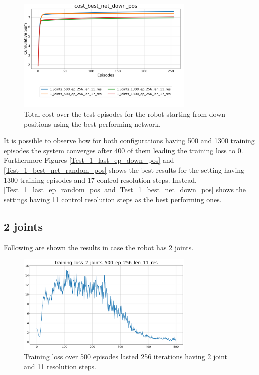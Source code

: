\documentclass[twocolumn, a4paper]{article}
\begin{document}
\begin{figure}[H]
	\centering
	\includegraphics[width=8.5cm]{"../Figures/Summary_cost_best_net_down_pos_1J.png"}
	\caption{Total cost over the test episodes for the robot starting from
			 down positions using the best performing network.}
	\label{fig:Test_1_best_net_down_pos}
\end{figure}

It is possible to observe how for both configurations having 500 and 1300
training episodes the system converges after 400 of them leading the
training loss to 0. Furthermore Figures \ref{Test_1_last_ep_down_pos} and
\ref{Test_1_best_net_random_pos} shows the best results for the setting having 
1300 training episodes and 17 control resolution steps. Instead,
\ref{Test_1_last_ep_random_pos} and \ref{Test_1_best_net_down_pos} shows the
settings having 11 control resolution steps as the best performing ones.

\subsection{2 joints}
Following are shown the results in case the robot has 2 joints.

\begin{figure}[H]
	\centering
	\includegraphics[width=8.5cm]{"../Figures/training_loss_2J_500E_256EL_11RES.png"}
	\caption{Training loss over 500 episodes lasted 256 iterations having 2
			 joint and 11 resolution steps.}
	\label{fig:TrainLoss_2_500_11}
\end{figure}
\end{document}
